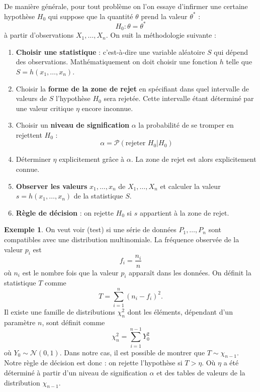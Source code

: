 \documentclass[a4paper,12pt]{report}
\theoremstyle{definition}
\renewcommand{\(}{\left(}
\renewcommand{\)}{\right)}
\renewcommand{\b}{\textbf}
\renewcommand{\P}{\mathcal{P}}
\renewcommand{\t}{\text}
\newtheorem{exmp}[thm]{Exemple}
\begin{document}
            De manière générale, pour tout problème on l'on essaye d'infirmer une certaine hypothèse $H_0$ qui suppose que la quantité $\theta$ prend la valeur $\theta^{*}$ :
            $$H_0 : \theta = \theta^{*}$$
            à partir d'observations $X_1,\dots,X_n$. On suit la méthodologie suivante :
            \begin{enumerate}
                \item \b{Choisir une statistique} : c'est-à-dire une variable aléatoire $S$ qui dépend des observations. Mathématiquement on doit choisir une fonction $h$ telle que $S=h(x_1,\dots,x_n)$.
                \item Choisir la \b{forme de la zone de rejet} en spécifiant dans quel intervalle de valeurs de $S$ l'hypothèse $H_0$ sera rejetée. Cette intervalle étant déterminé par une valeur critique $\eta$ encore inconnue.
                \item Choisir un \b{niveau de signification} $\alpha$ la probabilité de se tromper en rejettent $H_0$ :
                $$\alpha = \P(\t{rejeter }H_0|H_0)$$
                \item Déterminer $\eta$ explicitement grâce à $\alpha$. La zone de rejet est alors explicitement connue.
                \item \b{Observer les valeurs} $x_1,\dots,x_n$ de $X_1,\dots,X_n$ et calculer la valeur $s=h(x_1,\dots,x_n)$ de la statistique $S$.
                \item \b{Règle de décision} : on rejette $H_0$ si $s$ appartient à la zone de rejet.
            \end{enumerate}
            
            \begin{exmp}
                On veut voir (test) si une série de données $P_1,\dots,P_n$ sont compatibles avec une distribution multinomiale. La fréquence observée de la valeur $p_i$ est
                $$f_i = \frac{n_i}{n}$$
                où $n_i$ est le nombre fois que la valeur $p_i$ apparaît dans les données. On définit la statistique $T$ comme
                $$T = \sum_{i=1}^n (n_i-f_i)^2.$$
                Il existe une famille de distributions $\chi_n^2$ dont les éléments, dépendant d'un paramètre $n$, sont définit comme
                $$\chi_n^2 = \sum_{i=1}^{n-1} Y_0^2$$
                où $Y_0\sim\mathcal{N}(0,1)$. Dans notre cas, il est possible de montrer que $T\sim\chi_{n-1}$. Notre règle de décision est donc : on rejette l'hypothèse si $T > \eta$. Où $\eta$ a été déterminé à partir d'un niveau de signification $\alpha$ et des tables de valeurs de la distribution $\chi_{n-1}$.
            \end{exmp}
    


\end{document}

